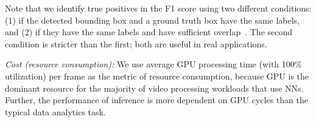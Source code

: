 \begin{packeditemize}
Note that we identify true positives in the F1 score using two different conditions: 
(1) if the detected bounding box and a ground truth box have the same labels,
and (2) if they have the same labels and have sufficient overlap~\cite{voc}.
The second condition is  stricter than the first; both are useful in real applications.
\item {\em Cost (resource consumption):}
We use average GPU processing time (with 100\% utilization) per frame
as the metric of resource consumption, because GPU is the dominant resource for the majority of video processing workloads that use NNs.
Further, the performance of \nn inference is more dependent on GPU cycles than the typical data analytics task.  %
\end{packeditemize}


